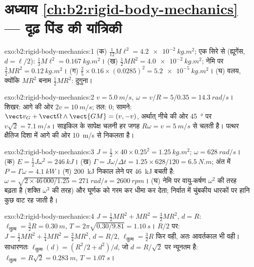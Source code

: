 \section*{अध्याय \ref{ch:b2:rigid-body-mechanics} --- दृढ़ पिंड की यांत्रिकी}

\begin{solution}{exo:b2:rigid-body-mechanics:1}
(क) $\tfrac1{12}M\ell^2 = \qty{4.2e-2}{kg.m^2}$; एक सिरे से (ह्यूगेंस,
$d = \ell/2$): $\tfrac13M\ell^2 = \qty{0.167}{kg.m^2}$। (ख)
$\tfrac12MR^2 =
\qty{4.0e-2}{kg.m^2}$; नेमि पर
$\tfrac32MR^2 = \qty{0.12}{kg.m^2}$।
(ग) $\tfrac25 \times 0.16 \times (0.0285)^2 = \qty{5.2e-5}{kg.m^2}$। (घ)
वलय, क्योंकि $MR^2$ बनाम $\tfrac12MR^2$: दुगुना।
\end{solution}

\begin{solution}{exo:b2:rigid-body-mechanics:2}
$v = \qty{5.0}{m/s}$, $\omega = v/R = 5/0.35 = \qty{14.3}{rad/s}$। शिखर:
आगे की ओर $2v = \qty{10}{m/s}$; तल: $0$; सामने:
$\vect v_G + \vect\Omega
\wedge\vect{GM} = (v, -v)$, अर्थात् नीचे की ओर
\qty{45}{\degree} पर
$v\sqrt2 = \qty{7.1}{m/s}$। साइकिल के सापेक्ष चलनी हर जगह
$R\omega = v = \qty{5}{m/s}$ से चलती है। पत्थर क्षैतिज दिशा में आगे की ओर
\qty{10}{m/s} से निकलता है।
\end{solution}

\begin{solution}{exo:b2:rigid-body-mechanics:3}
$J = \tfrac12 \times 40 \times 0.25^2 = \qty{1.25}{kg.m^2}$;
$\omega = \qty{628}{rad/s}$।
(क) $E = \tfrac12J\omega^2 = \qty{246}{kJ}$। (ख)
$\Gamma = J\omega/\Delta t =
1.25 \times 628/120 = \qty{6.5}{N.m}$; अंत में
$P = \Gamma\omega = \qty{4.1}{kW}$।
(ग) \qty{200}{kJ} निकाल लेने पर \qty{46}{kJ} बचती है:
$\omega = \sqrt{2 \times 46\,000/1.25}
= \qty{271}{rad/s} = \qty{2600}{rpm}$।
(घ) नेमि पर वायु-कर्षण
$\omega^2$ की तरह बढ़ता है (शक्ति $\omega^3$ की तरह) और घूर्णक को गरम कर
धीमा कर देता; निर्वात में चुंबकीय धारकों पर हानि कुछ वाट रह जाती है।
\end{solution}

\begin{solution}{exo:b2:rigid-body-mechanics:4}
$J = \tfrac12MR^2 + MR^2 = \tfrac32MR^2$, $d = R$:
$\ell_{\text{तुल्य}} = \tfrac32R
= \qty{0.30}{m}$,
$T = 2\pi\sqrt{0.30/9.81} = \qty{1.10}{s}$। $R/2$ पर:
$J =
\tfrac12MR^2 + \tfrac14MR^2 = \tfrac34MR^2$, $d = R/2$,
$\ell_{\text{तुल्य}} =
\tfrac32R$ फिर वही, अतः आवर्तकाल भी वही। साधारणतः
$\ell_{\text{तुल्य}}(d) = (R^2/2 +
d^2)/d$, जो $d = R/\sqrt2$ पर न्यूनतम है:
$\ell_{\text{तुल्य}} = R\sqrt2 = \qty{0.283}{m}$,
$T = \qty{1.07}{s}$।
\end{solution}

